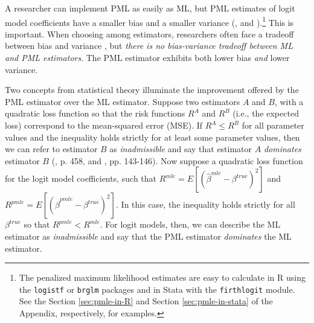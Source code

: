 \documentclass[12pt]{article}
\begin{document}
A researcher can implement PML as easily as ML, but PML estimates of logit model coefficients have a smaller bias \citep{Firth1993} and a smaller variance (\citealt[p. 49]{Kosmidis2007}, and \citealt{Copas1988}).\footnote{The penalized maximum likelihood estimates are easy to calculate in R using the \texttt{logistf} \citep{logistf} or \texttt{brglm} \citep{brglm} packages and in Stata with the \texttt{firthlogit} \citep{firthlogit} module. 
See the Section \ref{sec:pmle-in-R} and Section \ref{sec:pmle-in-stata} of the Appendix, respectively, for examples.}
This is important.
When choosing among estimators, researchers often face a tradeoff between bias and variance \citep[pp. 37-38]{HastieTibshiraniFriedman2013}, but \textit{there is no bias-variance tradeoff between ML and PML estimators}.
The PML estimator exhibits both lower bias \textit{and} lower variance.

Two concepts from statistical theory illuminate the improvement offered by the PML estimator over the ML estimator. 
Suppose two estimators $A$ and $B$, with a quadratic loss function so that the risk functions $R^A$ and $R^B$ (i.e., the expected loss) correspond to the mean-squared error (MSE). 
If $R^A \leq R^B$ for all parameter values and the inequality holds strictly for at least some parameter values, then we can refer to estimator $B$ as \textit{inadmissible} and say that estimator $A$ \textit{dominates} estimator $B$ (\citealt{DeGrootSchervish2012}, p. 458, and \citealt{LeonardHsu1999}, pp. 143-146). 
Now suppose a quadratic loss function for the logit model coefficients, such that $R^{mle} = E[(\hat{\beta}^{mle} - \beta^{true})^2]$ and $R^{pmle} = E[(\hat{\beta}^{pmle} - \beta^{true})^2]$. 
In this case, the inequality holds strictly for all $\beta^{true}$ so that $R^{pmle} < R^{mle}$. For logit models, then, we can describe the ML estimator as \textit{inadmissible} and say that the PML estimator \textit{dominates} the ML estimator.
\end{document}
